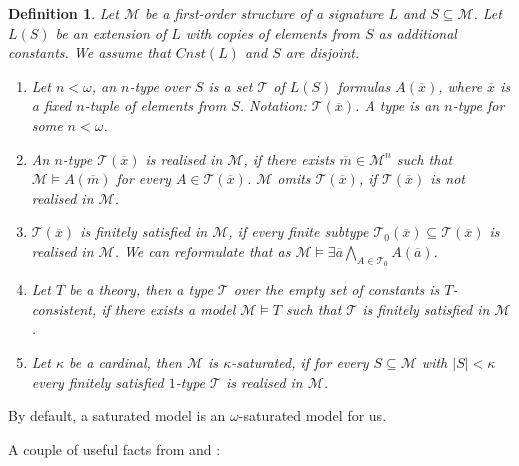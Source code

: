 \documentclass{article}
\theoremstyle{defin}
\newtheorem{definition}{Definition}
\theoremstyle{theorem}
\theoremstyle{claim}
\theoremstyle{prop}
\theoremstyle{lemma}
\theoremstyle{fact}
\theoremstyle{remark}
\theoremstyle{ex}
\theoremstyle{col}
\theoremstyle{question}
\begin{document}
\begin{definition} Let $\mathcal{M}$ be a first-order structure of a signature $L$ and $S \subseteq \mathcal{M}$. Let $L(S)$ be an extension of $L$ with copies of elements from $S$ as additional constants. We assume that $Cnst(L)$ and $S$ are disjoint.

\begin{enumerate}
\item Let $n < \omega$, an $n$-type over $S$ is a set $\mathcal{T}$ of $L(S)$ formulas $A(\overline{x})$, where $\overline{x}$ is a fixed $n$-tuple of elements from $S$. Notation: $\mathcal{T}(\overline{x})$. A type is an $n$-type for some $n < \omega$.
\item An $n$-type $\mathcal{T}(\overline{x})$ is realised in $\mathcal{M}$, if there exists $\overline{m} \in \mathcal{M}^n$ such that $\mathcal{M} \models A(\overline{m})$ for every $A \in \mathcal{T}(\overline{x})$. $\mathcal{M}$ omits $\mathcal{T}(\overline{x})$, if $\mathcal{T}(\overline{x})$ is not realised in $\mathcal{M}$.
\item $\mathcal{T}(\overline{x})$ is finitely satisfied in $\mathcal{M}$, if every finite subtype $\mathcal{T}_0(\overline{x}) \subseteq \mathcal{T}(\overline{x})$ is realised in $\mathcal{M}$. We can reformulate that as $\mathcal{M} \models \exists \overline{a} \bigwedge \limits_{A \in \mathcal{T}_0} A(\overline{a})$.
\item Let $T$ be a theory, then a type $\mathcal{T}$ over the empty set of constants is $T$-consistent, if there exists a model $\mathcal{M} \models T$ such that $\mathcal{T}$ is finitely satisfied in $\mathcal{M}$.
\item Let $\kappa$ be a cardinal, then $\mathcal{M}$ is $\kappa$-saturated, if for every $S \subseteq \mathcal{M}$ with $|S| < \kappa$ every finitely satisfied $1$-type $\mathcal{T}$ is realised in $\mathcal{M}$.
\end{enumerate}
\end{definition}

By default, a saturated model is an $\omega$-saturated model for us.

A couple of useful facts from \cite{chang1990model} and \cite{hodges1993model}:
\end{document}
